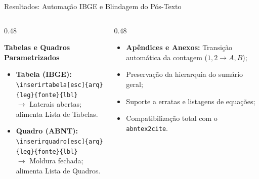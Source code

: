 \documentclass[aspectratio=169, 10pt]{beamer}
\begin{document}
\begin{frame}{Resultados: Automação IBGE e Blindagem do Pós-Texto}
  \begin{columns}[T]
    \begin{column}{0.48\textwidth}
      \begin{block}{\textbf{Tabelas e Quadros Parametrizados}}
        \scriptsize
        \begin{itemize}\setlength{\itemsep}{2.5pt}
          \item \textbf{Tabela (IBGE):}\\
            \texttt{\textbackslash inserirtabela[esc]\{arq\}\{leg\}\{fonte\}\{lbl\}}\\
            $\to$ Laterais abertas; alimenta Lista de Tabelas.
          \item \textbf{Quadro (ABNT):}\\
            \texttt{\textbackslash inserirquadro[esc]\{arq\}\{leg\}\{fonte\}\{lbl\}}\\
            $\to$ Moldura fechada; alimenta Lista de Quadros.
        \end{itemize}
      \end{block}
    \end{column}

    \begin{column}{0.48\textwidth}
      \begin{tcolorbox}[colback=white,colframe=conepeteal,arc=1.5mm,title=\textbf{Robustez Pós-Textual}]
        \scriptsize
        \begin{itemize}\setlength{\itemsep}{2.5pt}
          \item \textbf{Apêndices e Anexos:} Transição automática da contagem ($1, 2 \to A, B$);
          \item Preservação da hierarquia do sumário geral;
          \item Suporte a erratas e listagens de equações;
          \item Compatibilização total com o \texttt{abntex2cite}.
        \end{itemize}
      \end{tcolorbox}
    \end{column}
  \end{columns}
\end{frame}

\end{document}
